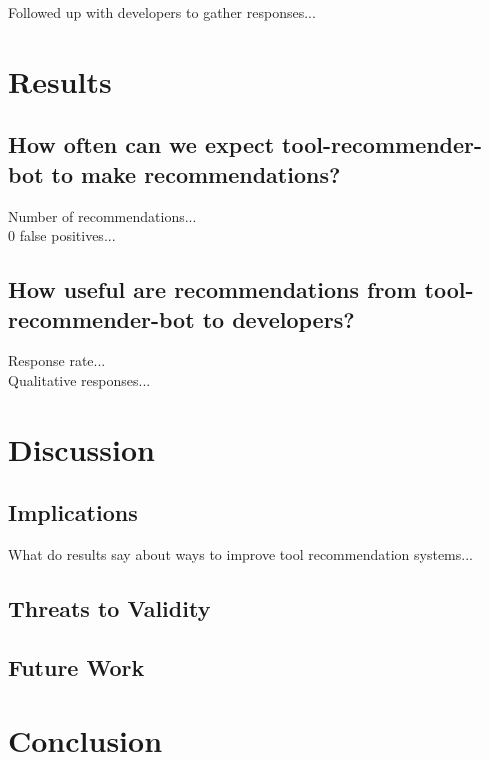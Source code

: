 \documentclass[conference]{IEEEtran}
\newcommand{\tool}{tool-recommender-bot }
\begin{document}
Followed up with developers to gather responses...

\section{Results}

\subsection{How often can we expect \tool to make recommendations?}

Number of recommendations... \\

0 false positives... \\

\subsection{How useful are recommendations from \tool to developers?}

Response rate...\\

Qualitative responses... \\

\section{Discussion}

\subsection{Implications}

What do results say about ways to improve tool recommendation systems...

\subsection{Threats to Validity}

\subsection{Future Work}

\section{Conclusion}






  
%

\end{document}
